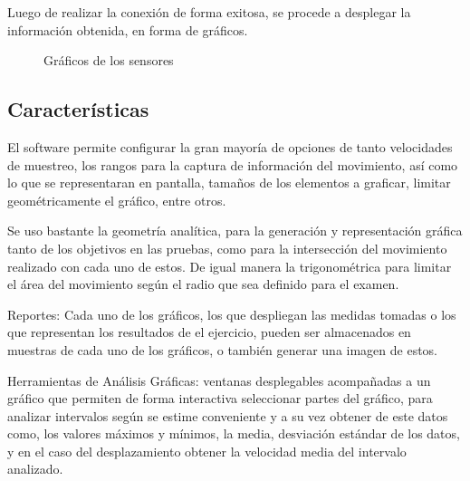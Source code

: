 \documentclass[12pt,a4paper]{article}
\begin{document}
Luego de realizar la conexión de forma exitosa, se procede a desplegar la información obtenida, en forma de gráficos.

\begin{figure}[H]
\centering
  \caption{Gráficos de los sensores}
  \label{fig:Graficosensores}
\end{figure}



\subsection{Características}
El software permite configurar la gran mayoría de opciones de tanto velocidades de muestreo, los rangos para la captura de información del movimiento, así como lo que se representaran en pantalla, tamaños de los elementos a graficar, limitar geométricamente el gráfico, entre otros.

Se uso bastante la geometría analítica, para la generación y representación gráfica tanto de los objetivos en las pruebas, como para la intersección del movimiento realizado con cada uno de estos. De igual manera la trigonométrica para limitar el área del movimiento según el radio que sea definido para el examen.

Reportes: Cada uno de los gráficos, los que despliegan las medidas tomadas o los que representan los resultados de el ejercicio, pueden ser almacenados en muestras de cada uno de los gráficos, o también generar una imagen de estos.

Herramientas de Análisis Gráficas: ventanas desplegables acompañadas a un gráfico que permiten de forma interactiva seleccionar partes del gráfico, para analizar intervalos según se estime conveniente y a su vez obtener de este datos como, los valores máximos y mínimos, la media, desviación estándar de los datos, y en el caso del desplazamiento obtener la velocidad media del intervalo analizado.
\end{document}
